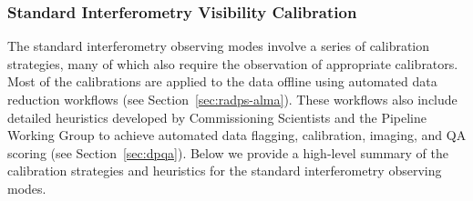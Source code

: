 \subsubsection{Standard Interferometry Visibility Calibration}\label{subsubsec:std_int_cal}

The standard interferometry observing modes involve a series of calibration strategies, many of which also require the observation of appropriate calibrators. Most of the calibrations are applied to the data offline using automated data reduction workflows (see Section~\ref{sec:radps-alma}). These workflows also include detailed heuristics developed by Commissioning Scientists and the Pipeline Working Group to achieve automated data flagging, calibration, imaging, and \ac{QA} scoring (see Section~\ref{sec:dpqa}). Below we provide a high-level summary of the calibration strategies and heuristics for the standard interferometry observing modes.

